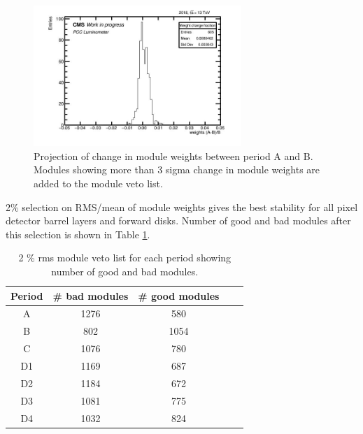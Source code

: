 \begin{figure}[!htp]
\centering
\includegraphics[width=0.7\textwidth]{ashish_thesis/mod_weight_comp_2.png}
\caption[Module Weights Change Removal]{%
   Projection of change in module weights between period A and B. Modules showing more than 3 sigma change in module weights are added to the module veto list.
}
\label{fig:mod_w_com_1}
\end{figure}
   
 2\% selection on RMS/mean of module weights gives the best stability for all pixel detector barrel layers and forward disks. Number of good and bad modules after this selection is shown in Table \ref{tab:per period veto}. %
                                                                                 
 \begin{table}
   \begin{center}
     \caption[Good/bad modules for each period]{2 \% rms module veto list for each period showing number of good and bad modules.}
    \begin{tabular}{ccccc}  
    \textbf{Period}   & \textbf{\# bad modules} & \textbf{\# good modules} \\ \hline
     A      &   1276   &  580    \\  
     B      &    802  &     1054  \\ 
     C      &   1076  &    780   \\ 
     D1     &  1169  &     687  \\ 
     D2     &  1184  &    672   \\ 
     D3     &  1081  &    775   \\ 
     D4     &  1032  &     824  \\ 
      \end{tabular}
    \label{tab:per period veto}
  \end{center}
\end{table}


